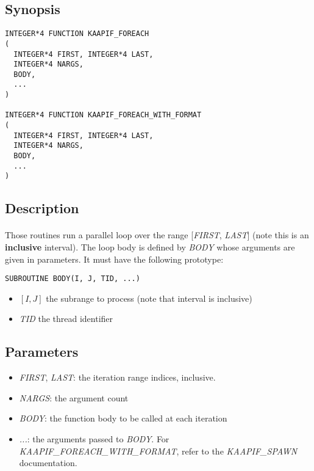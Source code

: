 \documentclass[a4paper, 11pt]{article}
\begin{document}
\subsection{Synopsis}
\begin{small}
\lstset{language=C}
\begin{lstlisting}[frame=tb]
INTEGER*4 FUNCTION KAAPIF_FOREACH
(
  INTEGER*4 FIRST, INTEGER*4 LAST,
  INTEGER*4 NARGS,
  BODY,
  ...
)

INTEGER*4 FUNCTION KAAPIF_FOREACH_WITH_FORMAT
(
  INTEGER*4 FIRST, INTEGER*4 LAST,
  INTEGER*4 NARGS,
  BODY,
  ...
)
\end{lstlisting}
\end{small}

\subsection{Description}
\paragraph{}
Those routines run a parallel loop over the range [\textit{FIRST}, \textit{LAST}]
(note this is an \textbf{inclusive} interval).
The loop body is defined by \textit{BODY} whose arguments are given
in parameters. It must have the following prototype:\\
\begin{small}
\lstset{language=C}
\begin{lstlisting}[frame=tb]
SUBROUTINE BODY(I, J, TID, ...)
\end{lstlisting}
\end{small}
\begin{itemize}
\item $[I, J]$ the subrange to process (note that interval is inclusive)
\item \textit{TID} the thread identifier
\end{itemize}

\subsection{Parameters}
\begin{itemize}
\item \textit{FIRST}, \textit{LAST}: the iteration range indices, inclusive.
\item \textit{NARGS}: the argument count
\item \textit{BODY}: the function body to be called at each iteration
\item \textit{...}: the arguments passed to \textit{BODY}. For
\textit{KAAPIF\_FOREACH\_WITH\_FORMAT}, refer to the \textit{KAAPIF\_SPAWN}
documentation.
\end{itemize}
\end{document}
